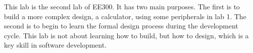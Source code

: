 This lab is the second lab of EE300. It has two main purposes. The first is to build a more complex design, a calculator, using some peripherals in lab 1. The second is to begin to learn the formal design process during the development cycle. This lab is not about learning how to build, but how to design, which is a key skill in software development.